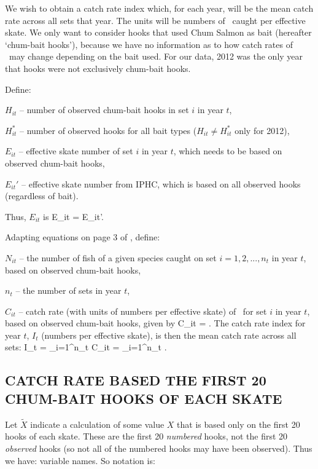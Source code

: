 We wish to obtain a catch rate index which, for each year, will be the mean
catch rate across all sets that year. The units will be numbers of
\spName~caught per effective skate. We only want to consider hooks that used
Chum Salmon as bait (hereafter `chum-bait hooks'), because we have no
information as to how catch rates of \spName~may change depending on the bait
used. For our data, 2012 was the only year that hooks were not exclusively
chum-bait hooks.

Define:

$H_{it}$ -- number of observed chum-bait hooks in set $i$ in year
$t$, %

$H_{it}^*$ -- number of observed hooks for all bait types
($H_{it} \neq H_{it}^*$ only for 2012), %

$E_{it}$ -- effective skate number of set $i$ in year $t$, which needs to be
based on observed chum-bait
hooks, %

$E_{it}'$ -- effective skate number from IPHC, which is based on all observed
hooks (regardless of bait). %

Thus, $E_{it}$ is
\eb
E_{it} =  E_{it}'.
\ee

Adapting equations on page 3 of \citet{yocld08}, define:

$N_{it}$ -- the number of fish of a given species caught on set $i=1,2,...,n_t$
in year $t$, based on observed chum-bait hooks, %

$n_t$ -- the number of sets in year
$t$, %

$C_{it}$ -- catch rate (with units of numbers per effective skate) of
\spName~for set $i$ in year $t$, based on observed chum-bait hooks, given by
\eb
C_{it} = .
\label{catchPerSet}
\ee
The catch rate index for year $t$, $I_t$ (numbers per effective skate), is then
the mean catch rate across all sets:
\eb
I_{t} =  \sum_{i=1}^{n_t} C_{it} =  \sum_{i=1}^{n_t} .
\label{index}
\ee

\subsection{CATCH RATE BASED THE FIRST 20 CHUM-BAIT HOOKS OF EACH SKATE}

Let $\tilde{X}$ indicate a calculation of some value $X$ that is based only on
the first 20 hooks of each skate. These are the first 20 \emph{numbered} hooks,
not the first 20 \emph{observed} hooks (so not all of the numbered hooks may
have been observed). Thus we have: %
variable names. So notation is:

